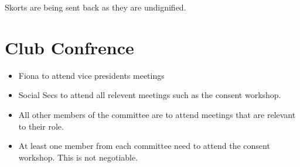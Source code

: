 \documentclass[12pt]{article}
\begin{document}
Skorts are being sent back as they are undignified.

\section{Club Confrence}
\begin{itemize}
    \item Fiona to attend vice presidents meetings

    \item Social Secs to attend all relevent meetings such as the consent workshop.
    \item All other members of the committee are to attend meetings that are relevant to their role.

    \item At least one member from each committee need to attend the consent workshop. This is not negotiable.
    
\end{itemize}
\end{document}
